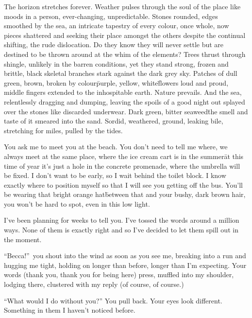 

\prelude

The horizon stretches forever. Weather pulses through the soul of the
place like moods in a person, ever-changing, unpredictable. Stones
rounded, edges smoothed by the sea, an intricate tapestry of every
colour, once whole, now pieces shattered and seeking their place
amongst the others despite the continual shifting, the rude
dislocation. Do they know they will never settle but are destined to
be thrown around at the whim of the elements? Trees thrust through
shingle, unlikely in the barren conditions, yet they stand strong,
frozen and brittle, black skeletal branches stark against the dark
grey sky. Patches of dull green, brown, broken by colour\=purple,
yellow, white\=flowers loud and proud, middle fingers extended to the
inhospitable earth. Nature prevails. And the sea, relentlessly
dragging and dumping, leaving the spoils of a good night out splayed
over the stones like discarded underwear. Dark green, bitter
seaweed\=the smell and taste of it smeared into the sand. Sordid,
weathered, ground, leaking bile, stretching for miles, pulled by the
tides.

\fugue

You ask me to meet you at the beach. You don’t need to tell me where,
we always meet at the same place, where the ice cream cart is in the
summer\=at this time of year it’s just a hole in the concrete
promenade, where the umbrella will be fixed. I don’t want to be early,
so I wait behind the toilet block. I know exactly where to position
myself so that I will see you getting off the bus. You’ll be wearing
that bright orange hat\=between that and your bushy, dark brown hair,
you won’t be hard to spot, even in this low light.

I’ve been planning for weeks to tell you. I’ve tossed the words around
a million ways.  None of them is exactly right and so I’ve decided to
let them spill out in the moment.

``Becca!''~you shout into the wind as soon as you see me, breaking
into a run and hugging me tight, holding on longer than before, longer
than I’m expecting. Your words (thank you, thank you for being here)
press, muffled into my shoulder, lodging there, clustered with my
reply (of course, of course.)

``What would I do without you?'' You pull back. Your eyes look
different. Something in them I haven’t noticed before.

